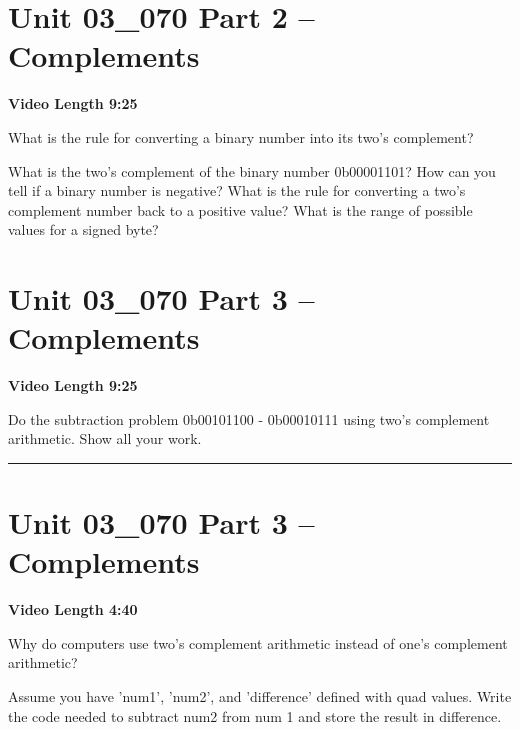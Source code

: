\documentclass[letterpaper,12pt]{exam}
\newcommand{\unit}{Unit 03}
\begin{document}
\begin{questions}
\section*{\unit\_070 Part 2 -- Complements}
\par{\selectfont\textbf{Video Length 9:25}}
\begin{samepage}
    \question What is the rule for converting a binary number into its two's complement?
    \vspace{5mm}
\end{samepage}
\par
    \question What is the two's complement of the binary number 0b00001101?
    \vspace{5mm}
    \question How can you tell if a binary number is negative?
    \vspace{5mm}
     \question What is the rule for converting a two's complement number back to a positive value?
     \vspace{5mm}
     \question What is the range of possible values for a signed byte?
     \vspace{5mm}
 \section*{\unit\_070 Part 3 -- Complements }
 \par{\selectfont\textbf{Video Length 9:25}}
 \begin{samepage}
     \question Do the subtraction problem 0b00101100 - 0b00010111 using two's complement arithmetic.  Show all your work.
     \vspace{40mm}
 \end{samepage}
 \par
 \rule{0.5\textwidth}{.4pt} %

 \section*{\unit\_070 Part 3 -- Complements }
 \par{\selectfont\textbf{Video Length 4:40}}
 \begin{samepage}
     \question Why do computers use two's complement arithmetic instead of one's complement arithmetic?
     \vspace{15mm}
 \end{samepage}
 \par

\begin{samepage}
    \question Assume you have 'num1', 'num2', and 'difference' defined with quad values.  Write the code needed to subtract num2 from num 1 and store the result in difference.
    \vspace{5mm}
\end{samepage}
\par
 

\end{questions} 
\end{document}
